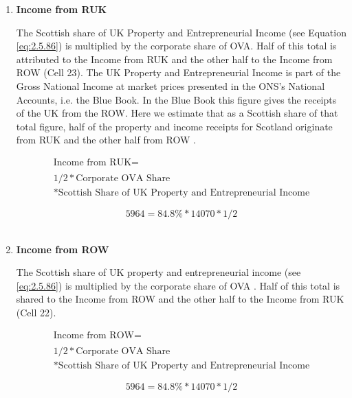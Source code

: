 \begin{enumerate}
\item \textbf {Income from RUK}

The Scottish share of UK Property and Entrepreneurial Income (see Equation \ref{eq:2.5.86}) is multiplied by the corporate share of OVA. Half of this total is attributed to the Income from RUK and the other half to the Income from ROW (Cell 23). The UK Property and Entrepreneurial Income is part of the Gross National Income at market prices presented in the ONS's National Accounts, i.e. the Blue Book. In the Blue Book this figure gives the receipts of the UK from the ROW. Here we estimate that as a Scottish share of that total figure, half of the property and income receipts for Scotland originate from RUK and the other half from ROW \cite{ScotGov2013a, ONS2011c}.

\begin{equation}
\begin{split}
\text{Income from RUK} =  \\ \\
1/2*\text{Corporate OVA Share}\\
*\text{Scottish Share of UK Property and Entrepreneurial Income}
\end{split} \label{eq:2.5.26}
\end{equation}

\begin{equation} \nonumber
5964 = 84.8\%*14070*1/2
\end{equation}\\


\item \textbf {Income from ROW}

The Scottish share of UK property and entrepreneurial income (see \ref{eq:2.5.86}) is multiplied by the corporate share of OVA \cite{ScotGov2013a, ONS2011c}. Half of this total is shared to the Income from ROW and the other half to the Income from RUK (Cell 22).

\begin{equation}
\begin{split}
\text{Income from ROW} =  \\ \\
1/2*\text{Corporate OVA Share}\\
*\text{Scottish Share of UK Property and Entrepreneurial Income}
\end{split} \label{eq:2.5.27}
\end{equation}

\begin{equation} \nonumber
5964 = 84.8\%*14070*1/2
\end{equation}\\



\end{enumerate}
